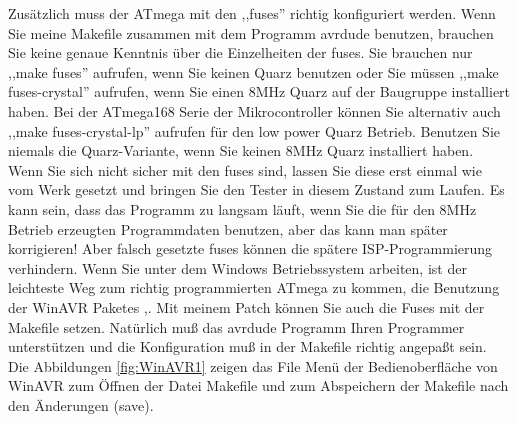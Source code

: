 Zusätzlich muss der ATmega mit den ,,fuses'' richtig konfiguriert werden.
Wenn Sie meine Makefile zusammen mit dem Programm avrdude \cite{avrdude} benutzen, brauchen Sie
keine genaue Kenntnis über die Einzelheiten der fuses.
Sie brauchen nur ,,make fuses'' aufrufen, wenn Sie keinen Quarz benutzen oder Sie
müssen ,,make fuses-crystal'' aufrufen, wenn Sie einen 8MHz Quarz auf der Baugruppe installiert haben.
Bei der ATmega168 Serie der Mikrocontroller können Sie alternativ auch
,,make fuses-crystal-lp'' aufrufen für den low power Quarz Betrieb.
Benutzen Sie niemals die Quarz-Variante, wenn Sie keinen 8MHz Quarz installiert haben.
Wenn Sie sich nicht sicher mit den fuses sind, lassen Sie diese erst einmal wie
vom Werk gesetzt und bringen Sie den Tester in diesem Zustand zum Laufen.
Es kann sein, dass das Programm zu langsam läuft, wenn Sie die für den 8MHz Betrieb 
erzeugten Programmdaten benutzen, aber das kann man später korrigieren!
Aber falsch gesetzte fuses können die spätere ISP-Programmierung verhindern.
Wenn Sie unter dem Windows Betriebssystem arbeiten, ist der leichteste Weg zum
richtig programmierten ATmega zu kommen, die Benutzung der WinAVR Paketes \cite{winavr1},\cite{winavr2}.
Mit meinem Patch \cite{winavr3} können Sie auch die Fuses mit der Makefile setzen.
Natürlich muß das avrdude Programm Ihren Programmer unterstützen und die Konfiguration muß in
der Makefile richtig angepaßt sein.
Die Abbildungen \ref{fig:WinAVR1} zeigen das File Menü der Bedienoberfläche von WinAVR zum
Öffnen der Datei Makefile und zum Abspeichern der Makefile nach den Änderungen (save).

